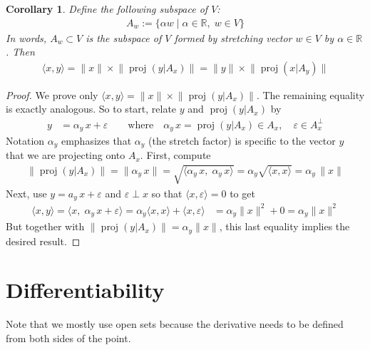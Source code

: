 \documentclass[12pt]{article}
\numberwithin{equation}{section} %
\theoremstyle{plain}
\newtheorem{cor}[thm]{Corollary}
\theoremstyle{definition}
\theoremstyle{remark}
\newcommand{\proj}{\operatorname{proj}}
\newcommand{\R}{\mathbb{R}}
\begin{document}
\begin{cor}
Define the following subspace of $V$:
\begin{align*}
  A_w:=\{\alpha w\;|\; \alpha\in \R, \; w\in V\}
\end{align*}
In words, $A_w\subset V$ is the subspace of $V$ formed by stretching
vector $w\in V$ by $\alpha\in\R$.
Then
\begin{align*}
  \langle x, y \rangle
  = \lVert x\rVert \times \lVert \proj(y|A_x)\rVert
  = \lVert y\rVert \times \lVert \proj(x|A_y)\rVert
\end{align*}
\end{cor}
\begin{proof}
We prove only
$\langle x, y \rangle
= \lVert x\rVert \times \lVert \proj(y|A_x)\rVert$.
The remaining equality is exactly analogous.
So to start, relate $y$ and $\proj(y|A_x)$ by
\begin{align*}
  y &= \alpha_y \, x + \varepsilon
  \qquad
  \text{where}\quad
  \alpha_y\, x= \proj(y|A_x)\in A_x,
  \quad \varepsilon\in A_x^\perp
\end{align*}
Notation $\alpha_y$ emphasizes that $\alpha_y$ (the stretch factor) is
specific to the vector $y$ that we are projecting onto $A_x$.
First, compute
\begin{align*}
  \lVert \proj(y|A_x)\rVert
  = \lVert \alpha_y \, x\rVert
  = \sqrt{\langle
    \alpha_y \, x,
    \;\alpha_y \, x\rangle}
  = \alpha_y \sqrt{\langle x, x\rangle}
  = \alpha_y \,\lVert x\rVert
\end{align*}
Next, use $y=a_y\,x + \varepsilon$ and $\varepsilon\perp x$ so that
$\langle x,\varepsilon\rangle=0$ to get
\begin{align*}
  \langle x, y \rangle
  =
  \langle x, \; \alpha_y \, x + \varepsilon \rangle
  =
  \alpha_y \langle x, x \rangle
  + \langle x, \varepsilon \rangle
  &=
  \alpha_y \lVert x\rVert^2
  + 0
  = \alpha_y \lVert x\rVert^2
\end{align*}
But together with
$\lVert \proj(y|A_x)\rVert = \alpha_y\lVert x\rVert$, this last equality
implies the desired result.
\end{proof}

\clearpage
\section{Differentiability}

Note that we mostly use open sets because the derivative needs to be
defined from both sides of the point.
\end{document}
